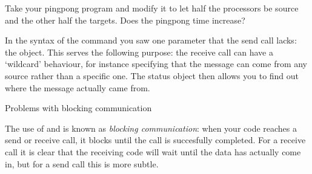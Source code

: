 \begin{exercise}
  \label{ex:hbwpingpong}
  Take your pingpong program and modify it 
  to let half the processors
  be source and the other half the targets. Does the pingpong time increase?
\end{exercise}

In the syntax of the  command you saw one parameter that
the send call lacks: the  object. This serves the following
purpose: the receive call can have a `wildcard' behaviour, for instance specifying
that the message can come from any source rather than a specific one. The status
object then allows you to find out where the message actually came from.

 {Problems with blocking communication}
\label{sec:blocking}

The use of  and 
is known as \emph{blocking communication}: when your code reaches a
send or receive call, it blocks until the call is succesfully completed.
For a receive call it is clear that the receiving code will wait until
the data has actually come in, but for a send call this is more subtle.

